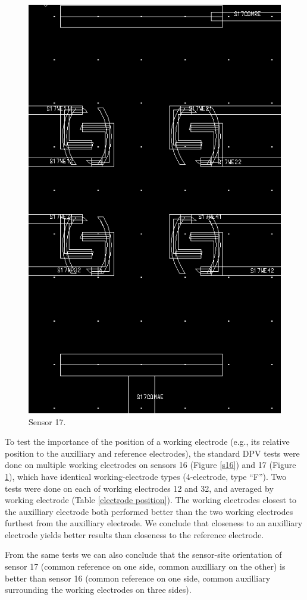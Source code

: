 \begin{figure}
	\centering
	\includegraphics[width=0.7\linewidth]{figures/s17.png}
	\caption{Sensor 17.}
	\label{s17}
\end{figure}

To test the importance of the position of a working electrode (e.g., its relative position to the auxilliary and reference electrodes), the standard DPV tests were done on multiple working electrodes on sensors 16 (Figure \ref{s16}) and 17 (Figure \ref{s17}), which have identical working-electrode types (4-electrode, type ``F''). Two tests were done on each of working electrodes 12 and 32, and averaged by working electrode (Table \ref{electrode position}). The working electrodes closest to the auxilliary electrode both performed better than the two working electrodes furthest from the auxilliary electrode. We conclude that closeness to an auxilliary electrode yields better results than closeness to the reference electrode.

From the same tests we can also conclude that the sensor-site orientation of sensor 17 (common reference on one side, common auxilliary on the other) is better than sensor 16 (common reference on one side, common auxilliary surrounding the working electrodes on three sides).

